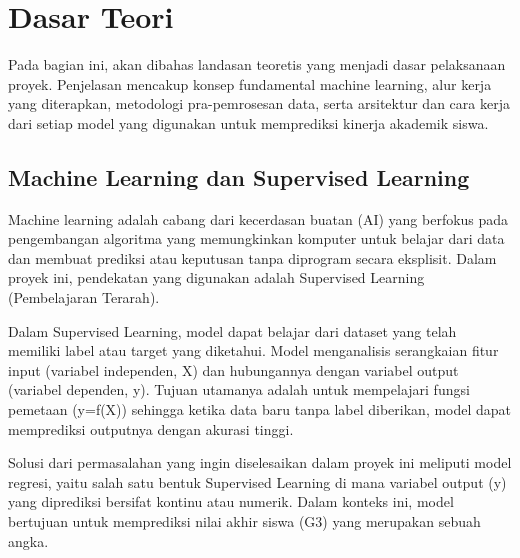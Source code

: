 \chapter*{Dasar Teori}

Pada bagian ini, akan dibahas landasan teoretis yang menjadi dasar pelaksanaan proyek. Penjelasan mencakup konsep fundamental machine learning, alur kerja yang diterapkan, metodologi pra-pemrosesan data, serta arsitektur dan cara kerja dari setiap model yang digunakan untuk memprediksi kinerja akademik siswa.

\section{Machine Learning dan Supervised Learning}
Machine learning adalah cabang dari kecerdasan buatan (AI) yang berfokus pada pengembangan algoritma yang memungkinkan komputer untuk belajar dari data dan membuat prediksi atau keputusan tanpa diprogram secara eksplisit. Dalam proyek ini, pendekatan yang digunakan adalah Supervised Learning (Pembelajaran Terarah).

Dalam Supervised Learning, model dapat belajar dari dataset yang telah memiliki label atau target yang diketahui. Model menganalisis serangkaian fitur input (variabel independen, X) dan hubungannya dengan variabel output (variabel dependen, y). Tujuan utamanya adalah untuk mempelajari fungsi pemetaan (y=f(X)) sehingga ketika data baru tanpa label diberikan, model dapat memprediksi outputnya dengan akurasi tinggi.

Solusi dari permasalahan yang ingin diselesaikan dalam proyek ini meliputi model regresi, yaitu salah satu bentuk Supervised Learning di mana variabel output (y) yang diprediksi bersifat kontinu atau numerik. Dalam konteks ini, model bertujuan untuk memprediksi nilai akhir siswa (G3) yang merupakan sebuah angka.

